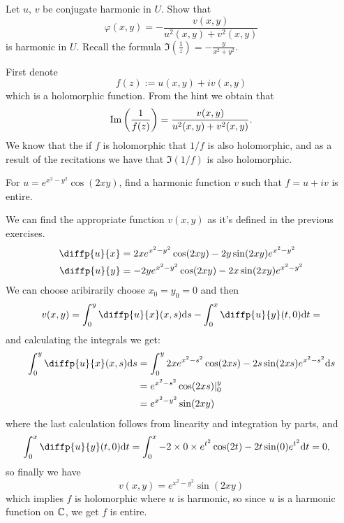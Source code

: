 \documentclass[11pt,a4paper]{article}
\begin{document}
\begin{exercise}
  Let $u$, $v$ be conjugate harmonic in $U$.
  Show that
  \[
    \varphi(x,y) = - \frac{v(x,y)}{u^2(x,y) + v^2(x,y)}
  \]
  is harmonic in $U$.
  Recall the formula $\Im(\frac{1}{z}) = - \frac{y}{x^2 + y^2}$.
\end{exercise}
\begin{solution}
  First denote
  \[
    f(z) := u(x,y) + i v(x,y)
  \]
  which is a holomorphic function.
  From the hint we obtain that
  \[
    \Im\del{\frac{1}{f(z)}} = \frac{v(x,y)}{u^2(x,y) + v^2(x,y)}.
  \]
  We know that the if $f$ is holomorphic that $1/f$ is also holomorphic,
  and as a result of the recitations we have that $\Im(1/f)$ is also
  holomorphic.
\end{solution}

\begin{exercise}
  For $u = e^{x^2 - y^2} \cos(2 x y)$, find a harmonic function
  $v$ such that $f = u + i v$ is entire.
\end{exercise}
\begin{solution}
  We can find the appropriate function $v(x,y)$ as it's defined in
  the previous exercises.
  \begin{align*}
    \diffp{u}{x} &= 2 x e^{x^2 - y^2} \cos(2xy) - 2 y \sin(2xy) e^{x^2 - y^2} \\
    \diffp{u}{y} &=
    - 2 y e^{x^2 - y^2} \cos(2xy) - 2 x \sin(2xy) e^{x^2 - y^2}
  \end{align*}
  We can choose aribirarily choose $x_0 = y_0 = 0$ and then
  \[
    v(x,y) =
    \int_{0}^{y} \diffp{u}{x}(x,s) \ds -
    \int_{0}^{x} \diffp{u}{y}(t,0) \dt =
  \]
  and calculating the integrals we get:
  \begin{align*}
    \int_{0}^{y} \diffp{u}{x}(x,s) \ds &=
    \int_{0}^{y} 2 x e^{x^2 - s^2} \cos(2xs) - 2 s \sin(2xs) e^{x^2 - s^2} \ds
    \\ &= e^{x^2 - s^2} \cos(2 x s) \vert^y_0 \\ &= e^{x^2 - y^2} \sin(2 x y)
  \end{align*}
  where the last calculation follows from linearity and integration by parts,
  and
  \begin{align*}
    \int_{0}^{x} \diffp{u}{y}(t,0) \dt &=
    \int_{0}^{x} 
    - 2 \times 0 \times  e^{t^2} \cos(2t) - 2 t \sin(0) e^{t^2} \dt = 0,
  \end{align*}
  so finally we have
  \[
    v(x,y) = e^{x^2 - y^2} \sin(2 x y)
  \]
  which implies $f$ is holomorphic where $u$ is harmonic, so since $u$ is
  a harmonic function on $\mathbb{C}$, we get $f$ is entire.
\end{solution}
\end{document}
